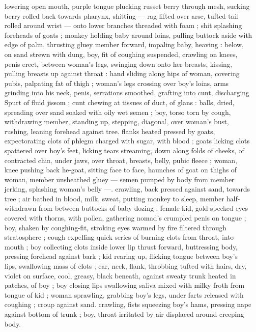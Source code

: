 {lowering open mouth, purple tongue plucking russet berry through 
mesh, sucking berry rolled back towards pharynx, shitting --- rag 
lifted over arse, tufted tail rolled around wrist --- onto lower 
branches threaded with foam ; shit splashing foreheads of goats ; 
monkey holding baby around loins, pulling buttock aside with edge 
of palm, thrusting gluey member forward, impaling baby, heaving : 
below, on sand strewn with dung, boy, fit of coughing suspended, 
crawling on knees, penis erect, between woman's legs, swinging 
down onto her breasts, kissing, pulling breasts up against throat : 
hand sliding along hips of woman, covering pubis, palpating fat of 
thigh ; woman's legs crossing over boy's loins, arms grinding into his 
neck, penis, serrations smoothed, grafting into cunt, discharging 
Spurt of fluid jissom ; cunt chewing at tissues of duct, of glans : 
balls, dried, spreading over sand soaked with oily wet semen ; boy, 
torso torn by cough, withdrawing member, standing up, stepping, 
diagonal, over woman's bust, rushing, leaning forehead against tree. 
flanks heated pressed by goats, expectorating clots of phlegm 
charged with sugar, with blood ; goats licking clots spattered over 
boy's feet, licking tears streaming, down along folds of cheeks, of 
contracted chin, under jaws, over throat, breasts, belly, pubic fleece 
; woman, knee pushing back he-goat, sitting face to face, haunches 
of goat on thighs of woman, member unsheathed gluey --- semen 
pumped by body from member jerking, splashing woman's belly ---. 
crawling, back pressed against sand, towards tree ; air bathed in 
blood, milk, sweat, putting monkey to sleep, member half-withdrawn 
from between buttocks of baby dozing ; female kid, gold-specked 
eyes covered with thorns, with pollen, gathering nomad's crumpled 
penis on tongue ; boy, shaken by coughing-fit, stroking eyes warmed 
by fire filtered through stratosphere ; cough expelling quick series of 
burning clots from throat, into mouth ; boy collecting clots inside 
lower lip thrust forward, buttressing body, pressing forehead against 
bark ; kid rearing up, flicking tongue between boy's lips, swallowing 
mass of clots ; ear, neck, flank, throbbing tufted with hairs, dry, violet 
on surface, cool, greasy, black beneath, against sweaty trunk heated 
in patches, of boy ; boy closing lips swallowing saliva mixed with 
milky froth from tongue of kid ; woman sprawling, grabbing boy's 
legs, under farts released with coughing ; croup against sand. 
crawling, fists squeezing boy's hams, pressing nape against bottom 
of trunk ; boy, throat irritated by air displaced around creeping body. 
}
